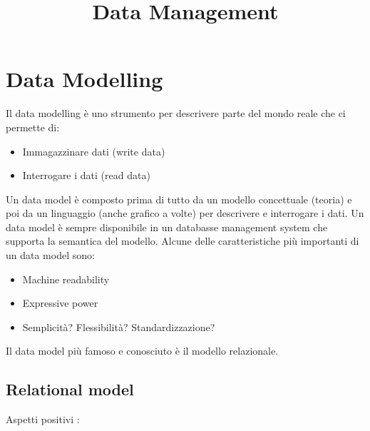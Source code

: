 \documentclass[a4page, 11pt]{article}
\title{Data Management}
\author{}
\date{}
\begin{document}
\maketitle

\section{Data Modelling}
Il data modelling è uno strumento per descrivere parte del mondo reale che ci permette di:
\begin{itemize}[noitemsep]
\item Immagazzinare dati (write data)
\item Interrogare i dati (read data)
\end{itemize}
Un data model è composto prima di tutto da un modello concettuale (teoria) e poi da un linguaggio (anche grafico a volte) per descrivere e interrogare i dati. Un data model è sempre disponibile in un databasse management system che supporta la semantica del modello. Alcune delle caratteristiche più importanti di un data model sono:
\begin{itemize}[noitemsep]
\item Machine readability
\item Expressive power
\item Semplicità? Flessibilità? Standardizzazione?
\end{itemize}
Il data model più famoso  e conosciuto è il modello relazionale.
\subsection{Relational model}

Aspetti positivi :
\end{document}
